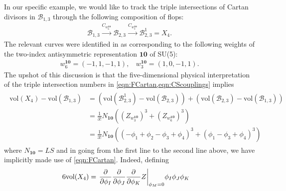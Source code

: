 \documentclass[11pt,oneside,english]{article}
\numberwithin{equation}{section}
\let\originalleft\left
\let\originalright\right
\renewcommand*{\left}{\mathopen{}\mathclose\bgroup\originalleft}
\renewcommand*{\right}{\aftergroup\egroup\originalright}
\theoremstyle{definition}
\begin{document}
In our specific example, we would like to track the triple intersections of Cartan divisors in $\mathscr B_{1,3}$ through the following composition of flops:
	\begin{align}
		\mathscr B_{1,3} \overset{C_{w_6^{\textbf{10}}}}{\rightarrow} \mathscr B_{2,3} \overset{C_{w_3^{\textbf{10}}}}{\rightarrow} \mathscr B_{2,3}^1 = X_4.
	\end{align}
The relevant curves were identified in \cite{Esole:2017kyr} as corresponding to the following weights of the two-index antisymmetric representation $\textbf{10}$ of SU(5):
	\begin{align}
		w_6^{\textbf{10}} =( -1,1,-1,1),~~~~ w_3^{\textbf{10}} = (1,0,-1,1). 
	\end{align}
The upshot of this discussion is that the five-dimensional physical interpretation of the triple intersection numbers in \cref{eqn:FCartan,eqn:CScouplings} implies 
	\begin{align}
	\begin{split}
	\label{eqn:diff}
		 \text{vol}(X_4) -  \text{vol}(\mathscr B_{1,3}) &=(\text{vol}(\mathscr B_{2,3}^1) - \text{vol}(\mathscr B_{2,3}) )+ (\text{vol}(\mathscr B_{2,3})- \text{vol}(\mathscr B_{1,3}))\\
		 &=  \frac{1}{3!} N_{\textbf{10}}((Z_{w_{3}^{\textbf{10}}})^3 +  (Z_{w_6^{\textbf{10}}})^3)\\
		 &=  \frac{1}{3!} N_{\textbf{10}} (( - \phi_1 + \phi_2 - \phi_3 + \phi_4)^3 + (\phi_1 - \phi_3 + \phi_4)^3)
	\end{split}
	\end{align}
where $N_{\textbf{10}} = L  S$ and in going from the first line to the second line above, we have implicitly made use of \cref{eqn:FCartan}. Indeed, defining
	\begin{align}
	\begin{split}
		6\text{vol}(X_4) &= \left. \frac{\partial}{\partial \phi_I} \frac{\partial}{\partial \phi_J} \frac{\partial}{\partial \phi_K} Z \right|_{\phi_M =0} \phi_I \phi_J \phi_K
	\end{split}
	\end{align}
\end{document}
